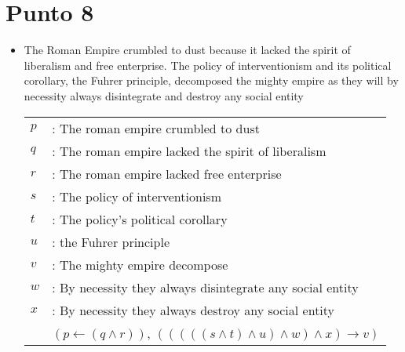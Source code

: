 \documentclass{article}
\begin{document}
\section{Punto 8}
\begin{itemize}
	\item The Roman Empire crumbled to dust because it lacked the spirit of liberalism and free enterprise. The policy of interventionism and its political corollary, the Fuhrer principle, decomposed the mighty empire as they will by necessity always disintegrate and destroy any social entity
	      \begin{center}
		      \begin{NiceTabular}{l l}
			      $p$ & : The roman empire crumbled to dust                                                \\
			      $q$ & : The roman empire lacked the spirit of liberalism                                 \\
			      $r$ & : The roman empire lacked free enterprise                                          \\
			      $s$ & : The policy of interventionism                                                    \\
			      $t$ & : The policy's political corollary                                                 \\
			      $u$ & : the Fuhrer principle                                                             \\
			      $v$ & : The mighty empire decompose                                                      \\
			      $w$ & : By necessity they always disintegrate any social entity                          \\
			      $x$ & : By necessity they always destroy any social entity                               \\
			      \hline
			          & $(p \gets (q \wedge r))$, $(((((s \wedge t) \wedge u) \wedge w) \wedge x) \to v )$
		      \end{NiceTabular}
	      \end{center}
\end{itemize}
\clearpage
\end{document}

